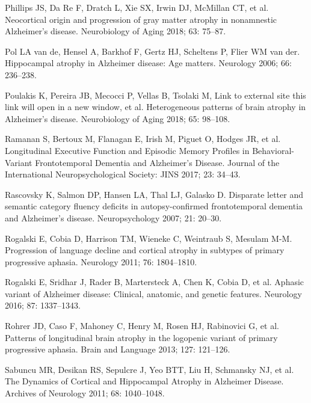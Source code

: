 \documentclass[]{article}
\begin{document}
\hypertarget{ref-phillips_neocortical_2018}{}
Phillips JS, Da Re F, Dratch L, Xie SX, Irwin DJ, McMillan CT, et al.
Neocortical origin and progression of gray matter atrophy in nonamnestic
Alzheimer's disease. Neurobiology of Aging 2018; 63: 75--87.

\hypertarget{ref-van_de_pol_hippocampal_2006}{}
Pol LA van de, Hensel A, Barkhof F, Gertz HJ, Scheltens P, Flier WM van
der. Hippocampal atrophy in Alzheimer disease: Age matters. Neurology
2006; 66: 236--238.

\hypertarget{ref-poulakis_heterogeneous_2018}{}
Poulakis K, Pereira JB, Mecocci P, Vellas B, Tsolaki M, Link to external
site this link will open in a new window, et al. Heterogeneous patterns
of brain atrophy in Alzheimer's disease. Neurobiology of Aging 2018; 65:
98--108.

\hypertarget{ref-ramanan_longitudinal_2017}{}
Ramanan S, Bertoux M, Flanagan E, Irish M, Piguet O, Hodges JR, et al.
Longitudinal Executive Function and Episodic Memory Profiles in
Behavioral-Variant Frontotemporal Dementia and Alzheimer's Disease.
Journal of the International Neuropsychological Society: JINS 2017; 23:
34--43.

\hypertarget{ref-rascovsky_disparate_2007}{}
Rascovsky K, Salmon DP, Hansen LA, Thal LJ, Galasko D. Disparate letter
and semantic category fluency deficits in autopsy-confirmed
frontotemporal dementia and Alzheimer's disease. Neuropsychology 2007;
21: 20--30.

\hypertarget{ref-rogalski_progression_2011}{}
Rogalski E, Cobia D, Harrison TM, Wieneke C, Weintraub S, Mesulam M-M.
Progression of language decline and cortical atrophy in subtypes of
primary progressive aphasia. Neurology 2011; 76: 1804--1810.

\hypertarget{ref-rogalski_aphasic_2016}{}
Rogalski E, Sridhar J, Rader B, Martersteck A, Chen K, Cobia D, et al.
Aphasic variant of Alzheimer disease: Clinical, anatomic, and genetic
features. Neurology 2016; 87: 1337--1343.

\hypertarget{ref-rohrer_patterns_2013}{}
Rohrer JD, Caso F, Mahoney C, Henry M, Rosen HJ, Rabinovici G, et al.
Patterns of longitudinal brain atrophy in the logopenic variant of
primary progressive aphasia. Brain and Language 2013; 127: 121--126.

\hypertarget{ref-sabuncu_dynamics_2011}{}
Sabuncu MR, Desikan RS, Sepulcre J, Yeo BTT, Liu H, Schmansky NJ, et al.
The Dynamics of Cortical and Hippocampal Atrophy in Alzheimer Disease.
Archives of Neurology 2011; 68: 1040--1048.
\end{document}
